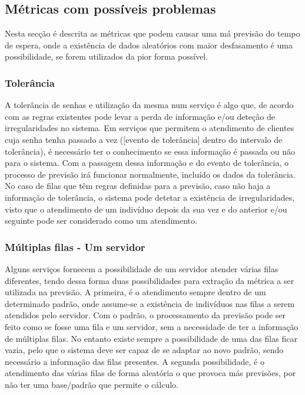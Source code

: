 \subsection{Métricas com possíveis problemas}

Nesta secção é descrita as métricas que podem causar uma má previsão do tempo de espera, onde a existência de dados aleatórios com maior desfasamento é uma possibilidade, se forem utilizados da pior forma possível.

\subsubsection{Tolerância}
A tolerância de senhas e utilização da mesma num serviço é algo que, de acordo com as regras existentes pode levar a perda de informação e/ou deteção de irregularidades no sistema. Em serviços que permitem o atendimento de clientes cuja senha tenha passado a vez ([evento de tolerância] dentro do intervalo de tolerância), é necessário ter o conhecimento se essa informação é passada ou não para o sistema. Com a passagem dessa informação e do evento de tolerância, o processo de previsão irá funcionar normalmente, incluído os dados da tolerância. No caso de filas que têm regras definidas para a previsão, caso não haja a informação de tolerância, o sistema pode detetar a existência de irregularidades, visto que o atendimento de um indivíduo depois da sua vez e do anterior e/ou seguinte pode ser considerado como um atendimento.

\subsubsection{Múltiplas filas - Um servidor}
Alguns serviços fornecem a possibilidade de um servidor atender várias filas diferentes, tendo dessa forma duas possibilidades para extração da métrica a ser utilizada na previsão. A primeira, é o atendimento sempre dentro de um determinado padrão, onde assume-se a existência de indivíduos nas filas a serem atendidos pelo servidor. Com o padrão, o processamento da previsão pode ser feito como se fosse uma fila e um servidor, sem a necessidade de ter a informação de múltiplas filas. No entanto existe sempre a possibilidade de uma das filas ficar vazia, pelo que o sistema deve ser capaz de se adaptar ao novo padrão, sendo necessário a informação das filas presentes. A segunda possibilidade, é o atendimento das várias filas de forma aleatória o que provoca más previsões, por não ter uma base/padrão que permite o cálculo.

